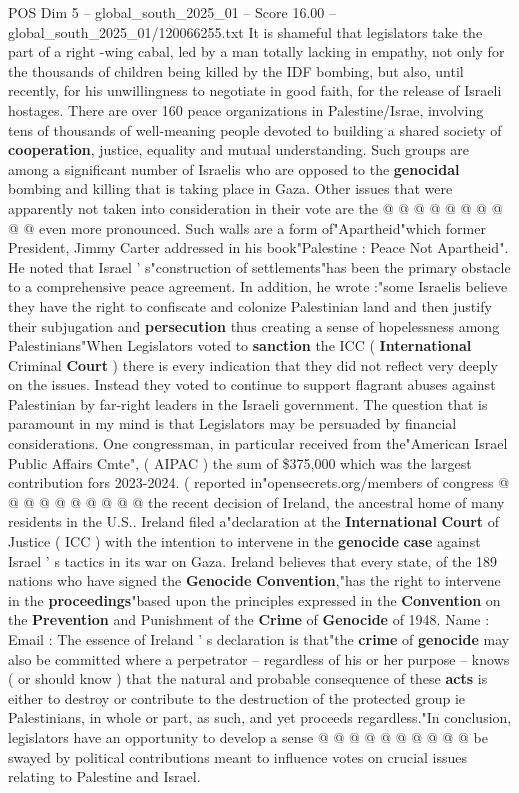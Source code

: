 \begin{textsample}{POS Dim 5 – global\_south\_2025\_01 – Score 16.00 – global\_south\_2025\_01/120066255.txt}
It is shameful that legislators take the part of a right -wing cabal, led by a man totally lacking in empathy, not only for the thousands of children being killed by the IDF bombing, but also, until recently, for his unwillingness to negotiate in good faith, for the release of Israeli hostages.
There are over 160 peace organizations in Palestine/Israe, involving tens of thousands of well-meaning people devoted to building a shared society of \textbf{cooperation}, justice, equality and mutual understanding.
Such groups are among a significant number of Israelis who are opposed to the \textbf{genocidal} bombing and killing that is taking place in Gaza.
Other issues that were apparently not taken into consideration in their vote are the @ @ @ @ @ @ @ @ @ @ even more pronounced.
Such walls are a form of"Apartheid"which former President, Jimmy Carter addressed in his book"Palestine : Peace Not Apartheid".
He noted that Israel ' s"construction of settlements"has been the primary obstacle to a comprehensive peace agreement.
In addition, he wrote :"some Israelis believe they have the right to confiscate and colonize Palestinian land and then justify their subjugation and \textbf{persecution} thus creating a sense of hopelessness among Palestinians"When Legislators voted to \textbf{sanction} the ICC ( \textbf{International} Criminal \textbf{Court} ) there is every indication that they did not reflect very deeply on the issues.
Instead they voted to continue to support flagrant abuses against Palestinian by far-right leaders in the Israeli government.
The question that is paramount in my mind is that Legislators may be persuaded by financial considerations.
One congressman, in particular received from the"American Israel Public Affairs Cmte", ( AIPAC ) the sum of \$375,000 which was the largest contribution fors 2023-2024. ( reported in"opensecrets.org/members of congress @ @ @ @ @ @ @ @ @ @ the recent decision of Ireland, the ancestral home of many residents in the U.S..
Ireland filed a"declaration at the \textbf{International} \textbf{Court} of Justice ( ICC ) with the intention to intervene in the \textbf{genocide} \textbf{case} against Israel ' s tactics in its war on Gaza.
Ireland believes that every state, of the 189 nations who have signed the \textbf{Genocide} \textbf{Convention},"has the right to intervene in the \textbf{proceedings}"based upon the principles expressed in the \textbf{Convention} on the \textbf{Prevention} and Punishment of the \textbf{Crime} of \textbf{Genocide} of 1948.
Name : Email : The essence of Ireland ' s declaration is that"the \textbf{crime} of \textbf{genocide} may also be committed where a perpetrator -- regardless of his or her purpose -- knows ( or should know ) that the natural and probable consequence of these \textbf{acts} is either to destroy or contribute to the destruction of the protected group ie Palestinians, in whole or part, as such, and yet proceeds regardless."In conclusion, legislators have an opportunity to develop a sense @ @ @ @ @ @ @ @ @ @ be swayed by political contributions meant to influence votes on crucial issues relating to Palestine and Israel.

\end{textsample}
